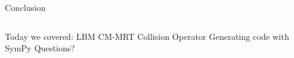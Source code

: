\begin{frame}{Conclusion}
\begin{columns}
\begin{center}
\begin{outline}
\1 Today we covered:
\2 LBM 
\2 CM-MRT Collision Operator 
\2 Generating code with SymPy
\1 Questions?
\end{outline}
\end{center}

\begin{center}
\end{center}

\end{columns}
\end{frame}
